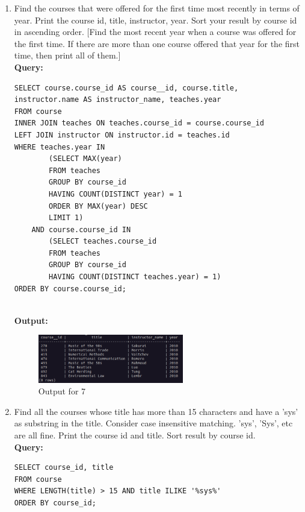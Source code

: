 \documentclass[12pt]{article}
\begin{document}
\begin{enumerate}[label=\textbf{\arabic*:}, left=0pt, labelsep=10pt, align=left, parsep=0pt, itemsep=10pt]
    \vspace{25pt}
    \item Find the courses that were offered for the first time most recently in terms of year. 
    Print the course id, title, instructor, year. Sort your result by course id in ascending order. 
    [Find the most recent year when a course was offered for the first time. 
    If there are more than one course offered that year for the first time, then print all of them.]
    \\ \textbf{Query:}
    \begin{lstlisting}
SELECT course.course_id AS course__id, course.title, instructor.name AS instructor_name, teaches.year
FROM course
INNER JOIN teaches ON teaches.course_id = course.course_id
LEFT JOIN instructor ON instructor.id = teaches.id
WHERE teaches.year IN
        (SELECT MAX(year)
        FROM teaches
        GROUP BY course_id
        HAVING COUNT(DISTINCT year) = 1
        ORDER BY MAX(year) DESC
        LIMIT 1)
    AND course.course_id IN
        (SELECT teaches.course_id
        FROM teaches
        GROUP BY course_id
        HAVING COUNT(DISTINCT teaches.year) = 1)
ORDER BY course.course_id;
    \end{lstlisting}

    \\ \textbf{Output:}
    \begin{figure}[H]
        \hspace{30pt}
        \includegraphics[width=0.6\textwidth]{images/7.png}
        \caption{Output for 7}
    \end{figure}

    \vspace{25pt}
    \item Find all the courses whose title has more than 15 characters and have a 'sys' as substring in the title. 
    Consider case insensitive matching. 'sys', 'Sys', etc are all fine. 
    Print the course id and title. Sort result by course id.
    \\ \textbf{Query:}
    \begin{lstlisting}
SELECT course_id, title 
FROM course
WHERE LENGTH(title) > 15 AND title ILIKE '%sys%'
ORDER BY course_id;
    \end{lstlisting}


\end{enumerate}
\end{document}
